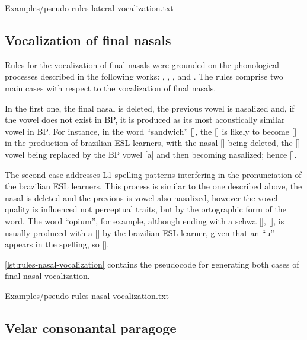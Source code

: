%
    {Examples/pseudo-rules-lateral-vocalization.txt}

\clearpage
\subsection{Vocalization of final nasals}

Rules for the vocalization of final nasals were grounded on the phonological processes described in the following works:
\citeauthor{Kluge2007} \citep{Kluge2007}, \citeauthor{Kluge2008} \citep{Kluge2008}, \citeauthor{Kluge2012} \citep{Kluge2012}, 
\citeauthor{Silveira2007} \citep{Silveira2007} and \citeauthor{Silveira2012} \citep{Silveira2012}.
The rules comprise two main cases with respect to the vocalization of final nasals. 

In the first one, the
final nasal is deleted, the previous vowel is nasalized and, if the vowel does not exist in \ac{BP}, it is produced as its
most acoustically similar vowel in \ac{BP}. For instance, in the word ``sandwich'' [],
the  [] is likely
to become [] in the production of brazilian \ac{ESL} learners, with the nasal [] being deleted, the 
[\textipa{\ae}] vowel being replaced by the \ac{BP} vowel [a] and then becoming nasalized; hence []. 

The second case addresses L1 spelling patterns interfering in the pronunciation of the brazilian \ac{ESL} learners. This process
is similar to the one described above, the nasal is deleted and the previous is vowel also nasalized, however the vowel quality is 
influenced not perceptual traits, but by the ortographic form of the word. The word ``opium'', for example, although ending
with a schwa [], [], is usually produced with a [] by the brazilian \ac{ESL} learner, given that an ``u''
appears in the spelling, so [].

\autoref{lst:rules-nasal-vocalization} contains the pseudocode for generating both cases of final nasal vocalization.

%
    {Examples/pseudo-rules-nasal-vocalization.txt}

\clearpage
\subsection{Velar consonantal paragoge}

